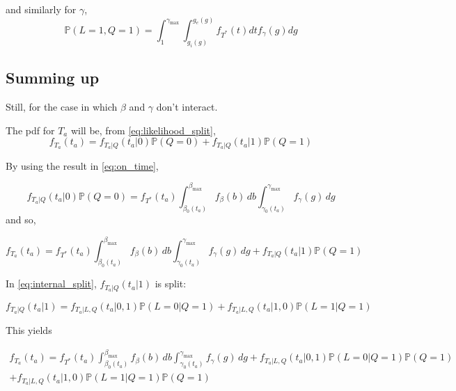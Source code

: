 \documentclass{article}
\begin{document}
and similarly for \(\gamma\),
\begin{equation}
  \label{eq:prob_in_gamma}
  \mathbb{P}(L=1, Q=1) = \int_1^{\gamma_\text{max}}\int_{g_i(g)}^{g_e(g)} f_{T^*}(t)dtf_\gamma(g)dg
\end{equation}

\subsection{Summing up}

Still, for the case in which \(\beta\) and \(\gamma\) don't interact.

The pdf for \(T_a\) will be, from \eqref{eq:likelihood_split},
\begin{equation*}
  f_{T_a}(t_a) = f_{T_a | Q}(t_a | 0)\mathbb{P}(Q = 0) + f_{T_a | Q}(t_a | 1)\mathbb{P}(Q = 1)
\end{equation*}

By using the result in \eqref{eq:on_time},

\begin{equation*}
  f_{T_a | Q}(t_a | 0)\mathbb{P}(Q = 0) = f_{T^*}(t_a)\int_{\beta_0(t_a)}^{\beta_\text{max}}f_\beta(b)\, db\int_{\gamma_0(t_a)}^{\gamma_\text{max}}f_\gamma(g)\, dg
\end{equation*}
and so,

\begin{equation*}
  f_{T_a}(t_a) = f_{T^*}(t_a)\int_{\beta_0(t_a)}^{\beta_\text{max}}f_\beta(b)\, db\int_{\gamma_0(t_a)}^{\gamma_\text{max}}f_\gamma(g)\, dg + f_{T_a | Q}(t_a | 1)\mathbb{P}(Q = 1)
\end{equation*}

In \eqref{eq:internal_split}, \(f_{T_a | Q}(t_a | 1)\) is split:

\begin{equation*}
  f_{T_a | Q}(t_a | 1) =  f_{T_a | L, Q}(t_a | 0, 1) \mathbb{P}(L=0 | Q=1) + f_{T_a | L, Q}(t_a | 1, 0) \mathbb{P}(L=1 | Q=1)
\end{equation*}

This yields

\begin{multline*}
  f_{T_a}(t_a) = f_{T^*}(t_a)\int_{\beta_0(t_a)}^{\beta_\text{max}}f_\beta(b)\, db\int_{\gamma_0(t_a)}^{\gamma_\text{max}}f_\gamma(g)\, dg + f_{T_a | L, Q}(t_a | 0, 1) \mathbb{P}(L=0 | Q=1)\mathbb{P}(Q = 1) \\ + f_{T_a | L, Q}(t_a | 1, 0) \mathbb{P}(L=1 | Q=1)\mathbb{P}(Q = 1)
\end{multline*}
\end{document}
